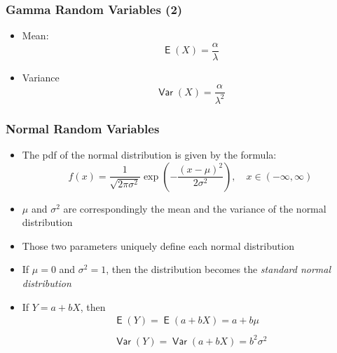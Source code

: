 \documentclass[10pt]{beamer}
\DeclareMathOperator{\E}{\mathsf{E}}
\DeclareMathOperator{\var}{\mathsf{Var}}
\theoremstyle{definition}
\begin{document}
\begin{frame}[fragile]
\frametitle{Gamma Random Variables (2)}
\begin{itemize}
	\item Mean:
	\[
		\E(X) = \dfrac{\alpha}{\lambda}
	\]
	
	\item Variance
	\[
		\var(X) = \dfrac{\alpha}{\lambda^{2}}
	\]
\end{itemize}
\end{frame}

\begin{frame}[fragile]
\frametitle{Normal Random Variables} 
\begin{itemize}
	\item The  pdf of the normal distribution is given by the formula:
	\[
		f(x) = \frac{1}{\sqrt{2\pi\sigma^{2}}}\exp\left(-\frac{(x - \mu)^{2}}{2\sigma^{2}}\right), \quad x \in (-\infty, \infty)
	\]
	
	\item $ \mu $ and $ \sigma^{2} $ are correspondingly the mean and the variance of the normal distribution
	
	\item Those two parameters uniquely define each normal distribution
	
	\item If $ \mu = 0 $ and $ \sigma^{2} = 1$, then the distribution becomes the \textit{standard normal distribution}
	
	\item If $ Y = a + bX $, then
	\[
		\begin{array}{lcl}
			\E(Y) = \E(a + bX) = a + b\mu\\
			\quad\\
			\var(Y) = \var(a + bX) = b^{2}\sigma^{2}
		\end{array}
	\]
\end{itemize}
\end{frame}
\end{document}
